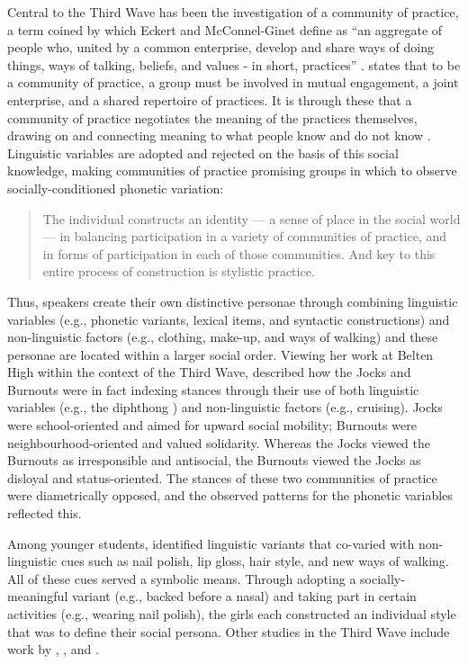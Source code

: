 Central to the Third Wave has been the investigation of a community of practice, a term coined by \citet{lavewenger1991} which Eckert and McConnel-Ginet define as ``an aggregate of people who, united by a common enterprise, develop and share ways of doing things, ways of talking, beliefs, and values - in short, practices'' \citep[186]{eckertmcconnellginet1999}. \citet{wenger1998} states that to be a community of practice, a group must be involved in mutual engagement, a joint enterprise, and a shared repertoire of practices. It is through these that a community of practice negotiates the meaning of the practices themselves, drawing on and connecting meaning to what people know and do not know \citep[73-85]{wenger1998}. Linguistic variables are adopted and rejected on the basis of this social knowledge, making communities of practice promising groups in which to observe socially-conditioned phonetic variation:


\begin{quote}
The individual constructs an identity --- a sense of place in the social world --- in balancing participation in a variety of communities of practice, and in forms of participation in each of those communities. And key to this entire process of construction is stylistic practice. \citep[17]{eckert2005}
\end{quote}

\noindent Thus, speakers create their own distinctive personae through combining linguistic variables (e.g., phonetic variants, lexical items, and syntactic constructions) and non-linguistic factors (e.g., clothing, make-up, and ways of walking) and these personae are located within a larger social order. Viewing her work at Belten High within the context of the Third Wave, \citet{eckert2005} described how the Jocks and Burnouts were in fact indexing stances through their use of both linguistic variables (e.g., the diphthong ) and non-linguistic factors (e.g., cruising). Jocks were school-oriented and aimed for upward social mobility; Burnouts were neighbourhood-oriented and valued solidarity. Whereas the Jocks viewed the Burnouts as irresponsible and antisocial, the Burnouts viewed the Jocks as disloyal and status-oriented. \noindent The stances of these two communities of practice were diametrically opposed, and the observed patterns for the phonetic variables reflected this.

Among younger students, \citet{eckert1996nailpolish} identified linguistic variants that co-varied with non-linguistic cues such as nail polish, lip gloss, hair style, and new ways of walking. All of these cues served a symbolic means. Through adopting a socially-meaningful variant (e.g., backed \textipa{/\ae/} before a nasal) and taking part in certain activities (e.g., wearing nail polish), the girls each constructed an individual style that was to define their social persona. Other studies in the Third Wave include work by \citet{mendozadenton2008}, \citet{zhang2005}, and \citet{podesva2011}.

